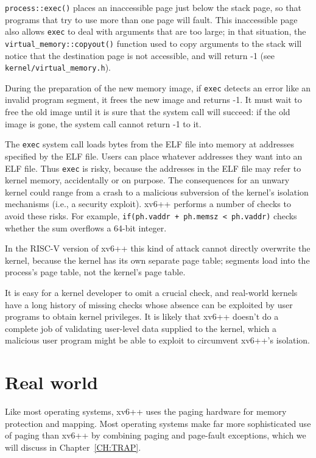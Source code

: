 \lstinline{process::exec()} places an inaccessible page just below the
stack page, so that programs that try to use more than one page will fault.
This inaccessible page also allows \lstinline{exec} to deal with arguments
that are too large; in that situation, the \lstinline{virtual_memory::copyout()}
function used to copy arguments to the stack will notice that the destination
page is not accessible, and will return -1 (see \texttt{kernel/virtual\_memory.h}).

During the preparation of the new memory image, if \lstinline{exec} detects an
error like an invalid program segment, it frees the new image and returns -1.
It must wait to free the old image until it is sure that the system call will
succeed: if the old image is gone, the system call cannot return -1 to it.

The \lstinline{exec} system call loads bytes from the ELF file into memory at
addresses specified by the ELF file. Users can place whatever addresses they
want into an ELF file. Thus \lstinline{exec} is risky, because the addresses
in the ELF file may refer to kernel memory, accidentally or on purpose. The
consequences for an unwary kernel could range from a crash to a malicious
subversion of the kernel's isolation mechanisms (i.e., a security exploit).
xv6++ performs a number of checks to avoid these risks. For example,
\lstinline{if(ph.vaddr + ph.memsz < ph.vaddr)} checks whether the sum overflows
a 64-bit integer.

In the RISC-V version of xv6++ this kind of attack cannot directly overwrite the
kernel, because the kernel has its own separate page table; segments load into
the process's page table, not the kernel's page table.

It is easy for a kernel developer to omit a crucial check, and real-world
kernels have a long history of missing checks whose absence can be exploited
by user programs to obtain kernel privileges. It is likely that xv6++ doesn't
do a complete job of validating user-level data supplied to the kernel, which
a malicious user program might be able to exploit to circumvent xv6++'s isolation.

\section{Real world}

Like most operating systems, xv6++ uses the paging hardware for memory
protection and mapping. Most operating systems make far more sophisticated
use of paging than xv6++ by combining paging and page-fault exceptions,
which we will discuss in Chapter~\ref{CH:TRAP}.


